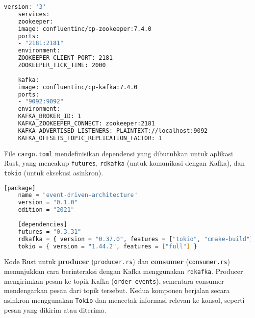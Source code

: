 \begin{lstlisting}[language=bash, caption={docker-compose.yml}]
	version: '3'
	services:
	zookeeper:
	image: confluentinc/cp-zookeeper:7.4.0
	ports:
	- "2181:2181"
	environment:
	ZOOKEEPER_CLIENT_PORT: 2181
	ZOOKEEPER_TICK_TIME: 2000
	
	kafka:
	image: confluentinc/cp-kafka:7.4.0
	ports:
	- "9092:9092"
	environment:
	KAFKA_BROKER_ID: 1
	KAFKA_ZOOKEEPER_CONNECT: zookeeper:2181
	KAFKA_ADVERTISED_LISTENERS: PLAINTEXT://localhost:9092
	KAFKA_OFFSETS_TOPIC_REPLICATION_FACTOR: 1
\end{lstlisting}

File \texttt{cargo.toml} mendefinisikan dependensi yang dibutuhkan untuk aplikasi Rust, yang mencakup \texttt{futures}, \texttt{rdkafka} (untuk komunikasi dengan Kafka), dan \texttt{tokio} (untuk eksekusi asinkron).

\begin{lstlisting}[language=bash, caption={cargo.toml}]
	[package]
	name = "event-driven-architecture"
	version = "0.1.0"
	edition = "2021"
	
	[dependencies]
	futures = "0.3.31"
	rdkafka = { version = "0.37.0", features = ["tokio", "cmake-build"] }
	tokio = { version = "1.44.2", features = ["full"] }
\end{lstlisting}

Kode Rust untuk \textbf{producer} (\texttt{producer.rs}) dan \textbf{consumer} (\texttt{consumer.rs}) menunjukkan cara berinteraksi dengan Kafka menggunakan \texttt{rdkafka}. Producer mengirimkan pesan ke topik Kafka (\texttt{order-events}), sementara consumer mendengarkan pesan dari topik tersebut. Kedua komponen berjalan secara asinkron menggunakan \texttt{Tokio} dan mencetak informasi relevan ke konsol, seperti pesan yang dikirim atau diterima.


